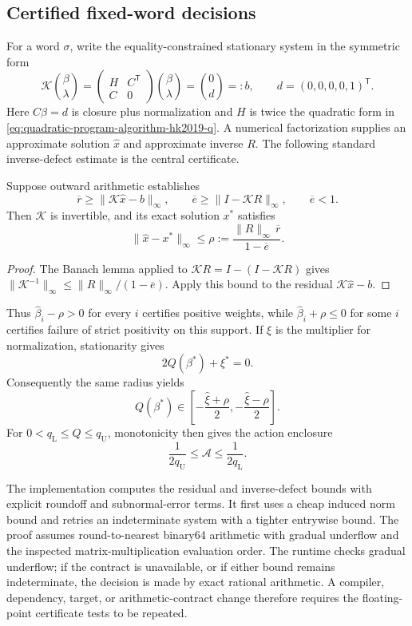 \subsection{Certified fixed-word decisions}

For a word \(\sigma\), write the equality-constrained stationary system in the
symmetric form
\[
  \mathcal K
  \binom{\beta}{\lambda}
  =
  \begin{pmatrix}H&C^{\mathsf T}\\ C&0\end{pmatrix}
  \binom{\beta}{\lambda}
  =
  \binom{0}{d}=:b,
  \qquad d=(0,0,0,0,1)^{\mathsf T}.
\]
Here \(C\beta=d\) is closure plus normalization and \(H\) is twice the
quadratic form in \eqref{eq:quadratic-program-algorithm-hk2019-q}.  A numerical
factorization supplies an approximate solution \(\widehat x\) and approximate
inverse \(R\).  The following standard inverse-defect estimate is the central
certificate.

\begin{lemma}\label{lem:numerics-verified-inverse-defect}
Suppose outward arithmetic establishes
\[
  \overline r\geq\|\mathcal K\widehat x-b\|_\infty,\qquad
  \overline e\geq\|I-\mathcal K R\|_\infty,\qquad
  \overline e<1.
\]
Then \(\mathcal K\) is invertible, and its exact solution \(x^\ast\) satisfies
\[
  \|\widehat x-x^\ast\|_\infty
  \leq
  \rho:=
  \frac{\|R\|_\infty\,\overline r}{1-\overline e}.
\]
\end{lemma}

\begin{proof}
The Banach lemma applied to
\(\mathcal K R=I-(I-\mathcal K R)\) gives
\(\|\mathcal K^{-1}\|_\infty\leq
\|R\|_\infty/(1-\overline e)\).  Apply this bound to the residual
\(\mathcal K\widehat x-b\).
\end{proof}

Thus \(\widehat\beta_i-\rho>0\) for every \(i\) certifies positive weights,
while \(\widehat\beta_i+\rho\leq0\) for some \(i\) certifies failure of
strict positivity on this support. If
\(\xi\) is the multiplier for normalization, stationarity gives
\[
  2Q(\beta^\ast)+\xi^\ast=0.
\]
Consequently the same radius yields
\[
  Q(\beta^\ast)\in
  \left[-\frac{\widehat\xi+\rho}{2},
        -\frac{\widehat\xi-\rho}{2}\right].
\]
For \(0<q_{\mathrm L}\leq Q\leq q_{\mathrm U}\), monotonicity then gives the
action enclosure
\[
  \frac{1}{2q_{\mathrm U}}
  \leq\mathcal A\leq
  \frac{1}{2q_{\mathrm L}}.
\]

The implementation computes the residual and inverse-defect bounds with
explicit roundoff and subnormal-error terms.  It first uses a cheap induced
norm bound and retries an indeterminate system with a tighter entrywise
bound.  The proof assumes round-to-nearest binary64 arithmetic with gradual
underflow and the inspected matrix-multiplication evaluation order.  The
runtime checks gradual underflow; if the contract is unavailable, or if either
bound remains indeterminate, the decision is made by exact rational
arithmetic.  A compiler, dependency, target, or arithmetic-contract change
therefore requires the floating-point certificate tests to be repeated.


